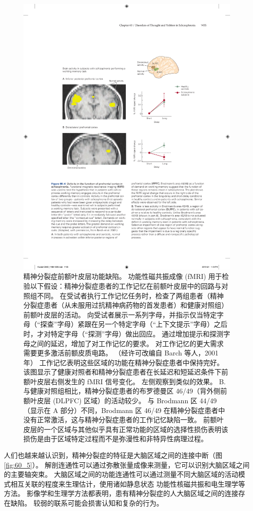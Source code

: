 \begin{figure}[htbp]
	\centering
	\includegraphics[width=0.8\linewidth]{chap60/fig_60_4}
	\caption{精神分裂症前额叶皮层功能缺陷。 功能性磁共振成像 (fMRI) 用于检验以下假设：精神分裂症患者的工作记忆在前额叶皮层中的回路与对照组不同。 在受试者执行工作记忆任务时，检查了两组患者（精神分裂症患者（从未服用过抗精神病药物的首发患者）和健康对照组）前额叶皮层的活动。 向受试者展示一系列字母，并指示仅当特定字母（“探查”字母）紧跟在另一个特定字母（“上下文提示”字母）之后时，才对特定字母（“探测”字母）做出回应。 通过增加提示和探测字母之间的延迟，增加了对工作记忆的要求。 对工作记忆的更大需求需要更多激活前额皮质电路。 （经许可改编自 Barch 等人，2001 年） 工作记忆表明这些区域的功能在精神分裂症患者中保持完好。 该图显示了健康对照者和精神分裂症患者在长延迟和短延迟条件下前额叶皮层右侧发生的 fMRI 信号变化。 左侧观察到类似的效果。 B. 与健康对照组相比，精神分裂症患者的布罗德曼区 46/49（背外侧前额叶皮层 (DLPFC) 区域）的活动较少。 与 Brodmann 区 44/49（显示在 A 部分）不同，Brodmann 区 46/49 在精神分裂症患者中没有正常激活，这与精神分裂症患者的工作记忆缺陷一致。 前额叶皮层的一个区域与其他似乎具有正常功能的区域的选择性损伤表明该损伤是由于区域特定过程而不是弥漫性和非特异性病理过程。}
	\label{fig:60_4}
\end{figure}


人们也越来越认识到，精神分裂症的特征是大脑区域之间的连接中断（图 \ref{fig:60_5}）。
解剖连通性可以通过弥散张量成像来测量，它可以识别大脑区域之间的主要轴突束。
大脑区域之间的功能连通性可以通过测量不同大脑区域的活动模式相互关联的程度来生理估计，使用诸如静息状态 功能性核磁共振和电生理学等方法。
影像学和生理学方法都表明，患有精神分裂症的人大脑区域之间的连接存在缺陷。
较弱的联系可能会损害认知和复杂的行为。


